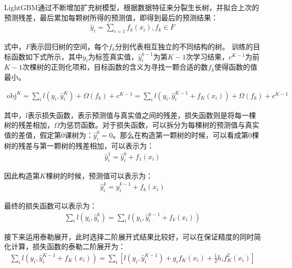 \documentclass[bwprint]{gmcmthesis}
\begin{document}
LightGBM通过不断增加扩充树模型，根据数据特征来分裂生长树，并拟合上次的预测残差，最后累加每颗树所得的预测值，即得到最后的预测结果：
\begin{equation}
\begin{aligned}
\hat{y}_i=\sum_{i=1} f_k\left(x_i\right), f_k \in F
\end{aligned}
\label{equ:1}
\end{equation}

式中，$F$表示回归树的空间，每个$f_k$分别代表相互独立的不同结构的树。
训练的目标函数如下式所示，其中$y_i$为标签真实值，$\hat{y}_i^{k-1}$为第$K-1$次学习结果，$c^{K-1}$为前$K-1$次棵树的正则化项和，目标函数的含义为寻找一颗合适的数$f_k$使得函数的值最小。

\begin{equation}
\begin{aligned}
\mathrm{obj}^K=\sum_i l\left(y_i, \hat{y}_i^K\right)+\Omega\left(f_k\right)+c^{K-1}=\sum_i l\left(y_i, \hat{y}_i^{K-1}+f_K\left(x_i\right)\right)+\Omega\left(f_k\right)+c^{K-1}
\end{aligned}
\label{equ:2}
\end{equation}

其中，$l$表示损失函数，表示预测值与真实值之间的残差，损失函数则是将每一棵树的残差相加，$\Omega$为惩罚函数。对于损失函数，可以拆分为每棵树的预测值与真实值的差值，假定第0课树为：$\hat{y}_i^0=0$。那么在构造第一颗树的时候，可以看成第0棵树的残差与第一颗树的残差相加，可以表示为：
\begin{equation}
\begin{aligned}
\hat{y}_i^1=\hat{y}_i^0+f_1\left(x_i\right)
\end{aligned}
\label{equ:3}
\end{equation}

因此构造第$K$棵树的时候，预测值可以表示为：
\begin{equation}
\begin{aligned}
\hat{y}_i^k=\hat{y}_i^{k-1}+f_k\left(x_i\right)
\end{aligned}
\label{equ:4}
\end{equation}

最终的损失函数可以表示为：
\begin{equation}
\begin{aligned}
\sum_i l\left(y_i, \hat{y}_i^k\right)=\sum_i l\left(y_i, \hat{y}_i^{k-1}+f_k\left(x_i\right)\right)
\end{aligned}
\label{equ:5}
\end{equation}

接下来运用泰勒展开，此时选择二阶展开式结果比较好，可以在保证精度的同时简化计算，损失函数的泰勒二阶展开为：
\begin{equation}
\begin{aligned}
\sum_i l\left(y_i, \hat{y}_i^{K-1}+f_K\left(x_i\right)\right)=\sum_i\left[l\left(y_i, \hat{y}_i^{K-1}\right)+g_i f_K\left(x_i\right)+\frac{1}{2} h_i f_K^2\left(x_i\right)\right]
\end{aligned}
\label{equ:6}
\end{equation}
\end{document}
